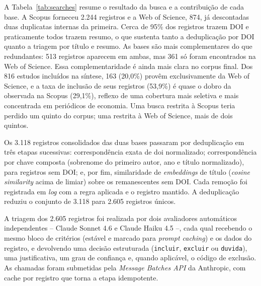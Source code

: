 A Tabela~\ref{tab:searches} resume o resultado da busca e a contribuição de cada base. A Scopus forneceu 2.244 registros e a Web of Science, 874, já descontadas duas duplicatas internas da primeira. Cerca de 95\% dos registros trazem DOI e praticamente todos trazem resumo, o que sustenta tanto a deduplicação por DOI quanto a triagem por título e resumo. As bases são mais complementares do que redundantes: 513 registros aparecem em ambas, mas 361 só foram encontrados na Web of Science. Essa complementaridade é ainda mais clara no corpus final. Dos 816 estudos incluídos na síntese, 163 (20,0\%) provêm exclusivamente da Web of Science, e a taxa de inclusão de seus registros (53,9\%) é quase o dobro da observada na Scopus (29,1\%), reflexo de uma cobertura mais seletiva e mais concentrada em periódicos de economia. Uma busca restrita à Scopus teria perdido um quinto do corpus; uma restrita à Web of Science, mais de dois quintos.

\begin{table}[htbp]
\centering
\caption{Resultado da busca por base e contribuição para o corpus final.}
\label{tab:searches}

\end{table}



Os 3.118 registros consolidados das duas bases passaram por deduplicação em três etapas sucessivas: correspondência exata de \gls{doi} normalizado; correspondência por chave composta (sobrenome do primeiro autor, ano e título normalizado), para registros sem DOI; e, por fim, similaridade de \textit{embeddings} de título (\textit{cosine similarity} acima de limiar) sobre os remanescentes sem DOI. Cada remoção foi registrada em \textit{log} com a regra aplicada e o registro mantido. A deduplicação reduziu o conjunto de 3.118 para 2.605 registros únicos.


A triagem dos 2.605 registros foi realizada por dois avaliadores automáticos independentes -- Claude Sonnet 4.6 e Claude Haiku 4.5 --, cada qual recebendo o mesmo bloco de critérios (estável e marcado para \textit{prompt caching}) e os dados do registro, e devolvendo uma decisão estruturada (\texttt{incluir}, \texttt{excluir} ou \texttt{duvida}), uma justificativa, um grau de confiança e, quando aplicável, o código de exclusão. As chamadas foram submetidas pela \textit{Message Batches API} da Anthropic, com cache por registro que torna a etapa idempotente.

